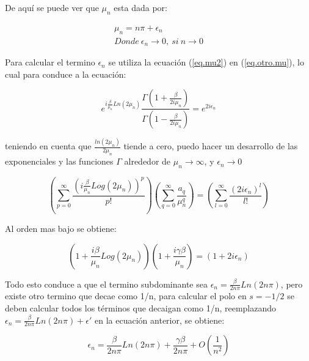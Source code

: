 De aquí se puede ver que $\mu _n$ esta dada por:


\begin{equation}
\begin{array}{c}
    \mu _n = n \pi + \epsilon _n \\
    Donde \ \epsilon _n \rightarrow{0} ,\ si \ n \rightarrow{0}
\end{array}
\label{eq.mu2}
\end{equation}



Para calcular el termino $\epsilon _n$ se utiliza la ecuación (\ref{eq.mu2}) en (\ref{eq.otro.mu}), lo cual para conduce a la ecuación:

\begin{equation}
	e ^{ i \frac{\beta}{ \mu _n} Ln(2 \mu _n)}     
    \frac{\Gamma(1 + \frac{ \beta}{2  i \mu _n} ) }
    {\Gamma(1 -  \frac{ \beta}{2  i \mu _n} )} =    
    e ^{2 i \epsilon _n }
\end{equation}

teniendo en cuenta que $\frac{ln(2 \mu _n)}{2 \mu _n }$ tiende a cero, puedo hacer un desarrollo de las exponenciales y las funciones $\Gamma$ alrededor de $ \mu _n \rightarrow \infty $, y $\epsilon _n \rightarrow 0$

\begin{equation}
    \left(
    \sum _{p = 0} ^{\infty} \frac{ \left( i \frac{\beta}{ \mu _n } Log(2 \mu _n ) \right) ^p }{p!}
    \right)
    \left(
	\sum _{q = 0} ^{\infty} \frac{a _q}{\mu _n ^q}
	\right)
    =
    \left(
    \sum _{l = 0} ^{\infty} \frac{( 2 i \epsilon _n)^l}{l !}
    \right)
\end{equation}


Al orden mas bajo se obtiene: 

\begin{equation}
(1 + \frac{i \beta}{ \mu _n} Log( 2 \mu _n) ) 
(1 + \frac{i  \gamma \beta}{ \mu _n})  =
(1 + 2 i \epsilon _n)
\end{equation}

Todo esto conduce a que el termino subdominante sea $\epsilon _n =  \frac{\beta }{2 n \pi}  Ln(2 n \pi)$, pero existe otro termino que decae como 1/n, para calcular el polo en $s=-1/2$ se deben calcular todos los términos que decaigan como 1/n, reemplazando $\epsilon _n =  \frac{\beta }{2 n \pi} Ln(2 n \pi) + \epsilon '$ en la ecuación anterior, se obtiene:


\begin{equation}
    \epsilon _n =  \frac{\beta }{2 n \pi} Ln(2 n \pi) +
                \frac{\gamma \beta}{2 n \pi} +
                O\left(  \frac{1}{n^2} \right)
\end{equation}

